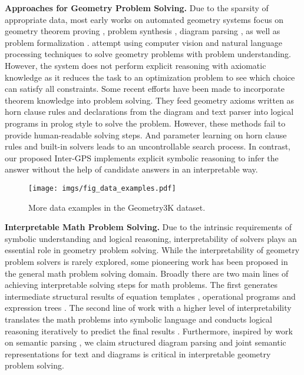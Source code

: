 \documentclass[11pt,a4paper]{article}
\begin{document}
\textbf{Approaches for Geometry Problem Solving.} Due to the sparsity of appropriate data, most early works on automated geometry systems focus on geometry theorem proving \cite{wen1986basic,chou1996automated, yu2019framework,gan2019automatically}, problem synthesis \cite{alvin2014synthesis}, diagram parsing \cite{seo2014diagram}, as well as problem formalization \cite{gan2018automatic}. \cite{seo2015solving} attempt using computer vision and natural language processing techniques to solve geometry problems with problem understanding.
However, the system does not perform explicit reasoning with axiomatic knowledge as it reduces the task to an optimization problem to see which choice can satisfy all constraints. Some recent efforts \cite{sachan2017textbooks,sachan2020discourse} have been made to incorporate theorem knowledge into problem solving. They feed geometry axioms written as horn clause rules and declarations from the diagram and text parser into logical programs in prolog style to solve the problem. However, these methods fail to provide human-readable solving steps. And parameter learning on horn clause rules and built-in solvers leads to an uncontrollable search process. In contrast, our proposed Inter-GPS implements explicit symbolic reasoning to infer the answer without the help of candidate answers in an interpretable way. 


\begin{figure*}[th]
    \centering 
    \texttt{[image: imgs/fig\_data\_examples.pdf]}
    \caption{More data examples in the Geometry3K dataset.}
    \label{fig:data_examples}
\end{figure*}

\textbf{Interpretable Math Problem Solving.} Due to the intrinsic requirements of symbolic understanding and logical reasoning, interpretability of solvers plays an essential role in geometry problem solving. While the interpretability of geometry problem solvers is rarely explored, some pioneering work has been proposed in the general math problem solving domain. Broadly there are two main lines of achieving interpretable solving steps for math problems. The first generates intermediate structural results of equation templates \cite{huang2017learning,wang2019template}, operational programs \cite{amini2019mathqa} and expression trees \cite{wang2018translating,qin2020semantically,hong2021weakly}. The second line of work with a higher level of interpretability translates the math problems into symbolic language and conducts logical reasoning iteratively to predict the final results \cite{matsuzaki2017semantic,roy2018mapping}. Furthermore, inspired by work on semantic parsing \cite{han2005bottom,zhu2007stochastic,tu2014joint}, we claim structured diagram parsing and joint semantic representations for text and diagrams is critical in interpretable geometry problem solving.
\end{document}
